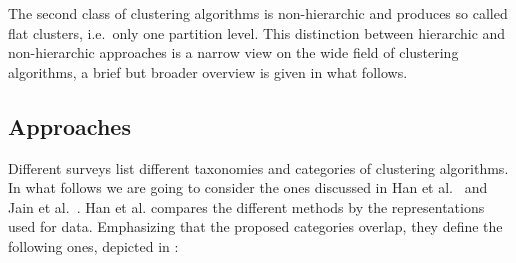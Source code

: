\noindent The second class of clustering algorithms is non-hierarchic and produces so called flat clusters, i.e.~only one partition level. This distinction between hierarchic and non-hierarchic approaches is a narrow view on the wide field of clustering algorithms, a brief but broader overview is given in what follows.

\subsection{Approaches}\label{\positionnumber}
Different surveys list different taxonomies and categories of clustering algorithms. In what follows we are going to consider the ones discussed in Han et al.~\cite{han2011data} and Jain et al.~\cite{overview_clust}.
Han et al. compares the different methods by the representations used for data. Emphasizing that the proposed categories overlap, they define the following ones, depicted in :
